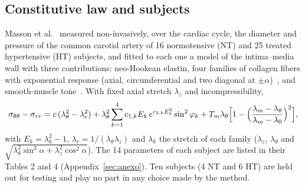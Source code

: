 \subsection{Constitutive law and subjects}
Masson et al.~\cite{masson} measured non-invasively, over the cardiac cycle, the diameter and pressure of the common carotid artery of 16 normotensive (NT) and 25 treated hypertensive (HT) subjects, and fitted to each one a model of the intima--media wall with three contributions: neo-Hookean elastin, four families of collagen fibers with exponential response (axial, circumferential and two diagonal at $\pm\alpha$)~\cite{holzapfel}, and smooth-muscle tone~\cite{rachev}. With fixed axial stretch $\lambda_z$ and incompressibility,
\begin{equation}\label{eq:masson}
\sigma_{\theta\theta}-\sigma_{rr}=c\,(\lambda_\theta^2-\lambda_r^2)+\lambda_\theta^2\sum_{k=1}^{4}c_{1,k}E_k\,e^{c_{2,k}E_k^2}\sin^2\varphi_k+T_m\lambda_\theta\Bigl[1-\Bigl(\frac{\lambda_m-\lambda_\theta}{\lambda_m-\lambda_0}\Bigr)^2\Bigr],
\end{equation}
with $E_k=\lambda_k^2-1$, $\lambda_r=1/(\lambda_\theta\lambda_z)$ and $\lambda_k$ the stretch of each family ($\lambda_z$, $\lambda_\theta$ and $\sqrt{\lambda_\theta^2\sin^2\alpha+\lambda_z^2\cos^2\alpha}$). The 14 parameters of each subject are listed in their Tables 2 and 4 (Appendix~\ref{sec:anexo}). Ten subjects (4 NT and 6 HT) are held out for testing and play no part in any choice made by the method.

